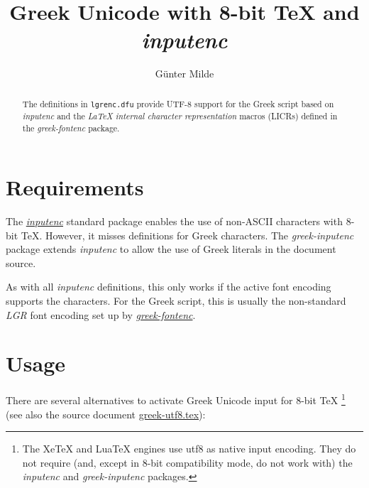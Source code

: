 \documentclass[a4paper]{scrartcl}
\begin{document}
\title{Greek Unicode with 8-bit TeX and \emph{inputenc}}
\author{Günter Milde}
\maketitle

\begin{abstract}
The definitions in \texttt{lgrenc.dfu} provide UTF-8 support for
the Greek script based on \emph{inputenc} and the \emph{LaTeX internal
character representation} macros (LICRs) defined in the \emph{greek-fontenc}
package.
\end{abstract}

\section{Requirements}

The \href{http://www.ctan.org/pkg/inputenc}{\emph{inputenc}} standard
package enables the use of non-ASCII characters with 8-bit TeX. However, it
misses definitions for Greek characters. The \emph{greek-inputenc} package
extends \emph{inputenc} to allow the use of Greek literals in the document
source.

As with all \emph{inputenc} definitions, this only works if the active font
encoding supports the characters. For the Greek script, this is usually the
non-standard \emph{LGR} font encoding set up by
\href{http://www.ctan.org/pkg/greek-fontenc}{\emph{greek-fontenc}}.

\section{Usage}

There are several alternatives to activate Greek Unicode input for 8-bit TeX%
\footnote{
  The XeTeX and LuaTeX engines use utf8 as native input encoding. They do
  not require (and, except in 8-bit compatibility mode, do not work with)
  the \emph{inputenc} and \emph{greek-inputenc} packages.}
%
(see also the source document \url{greek-utf8.tex}):
\end{document}
